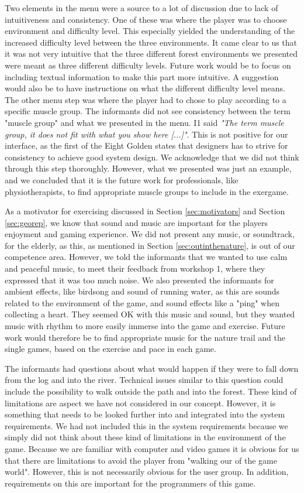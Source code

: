 Two elements in the menu were a source to a lot of discussion due to lack of intuitiveness and consistency. One of these was where the player was to choose environment and difficulty level. This especially yielded the understanding of the increased difficulty level between the three environments. It came clear to us that it was not very intuitive that the three different forest environments we presented were meant as three different difficulty levels. Future work would be to focus on including textual information to make this part more intuitive. A suggestion would also be to have instructions on what the different difficulty level means. The other menu step was where the player had to chose to play according to a specific muscle group. The informants did not see consistency between the term "muscle group" and what we presented in the menu. I1 said \emph{"The term muscle group, it does not fit with what you show here [...]"}. This is not positive for our interface, as the first of the Eight Golden states that designers has to strive for consistency to achieve good system design. We acknowledge that we did not think through this step thoroughly. However, what we presented was just an example, and we concluded that it is the future work for professionals, like physiotherapists, to find appropriate muscle groups to include in the exergame.

As a motivator for exercising discussed in Section \ref{sec:motivators} and Section \ref{sec:georep}, we know that sound and music are important for the players enjoyment and gaming experience. We did not present any music, or soundtrack, for the elderly, as this, as mentioned in Section \ref{sec:outinthenature}, is out of our competence area. However, we told the informants that we wanted to use calm and peaceful music, to meet their feedback from workshop 1, where they expressed that it was too much noise. We also presented the informants for ambient effects, like birdsong and sound of running water, as this are sounds related to the environment of the game, and sound effects like a "ping" when collecting a heart. They seemed OK with this music and sound, but they wanted music with rhythm to more easily immerse into the game and exercise. Future work would therefore be to find appropriate music for the nature trail and the single games, based on the exercise and pace in each game. 

The informants had questions about what would happen if they were to fall down from the log and into the river. Technical issues similar to this question could include the possibility to walk outside the path and into the forest. These kind of limitations are aspect we have not considered in our concept. However, it is something that needs to be looked further into and integrated into the system requirements. We had not included this in the system requirements because we simply did not think about these kind of limitations in the environment of the game. Because we are familiar with computer and video games it is obvious for us that there are limitations to avoid the player from "walking our of the game world". However, this is not necessarily obvious for the user group. In addition, requirements on this are important for the programmers of this game. 

